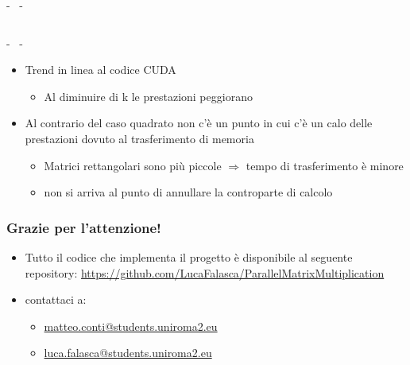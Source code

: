 \documentclass[compress]{beamer}
\begin{document}
\begin{frame}{\secname \text{ }- \subsecname\ \text{ }- \subsubsecname}
\begin{columns}
\begin{minipage}{0.75\textwidth}
\begin{adjustbox}{margin=1cm 0cm 0cm 0cm, center}
                \end{adjustbox}
            \end{minipage}
    \end{columns}
\end{frame}

\begin{frame}{\secname \text{ }- \subsecname\ \text{ }- \subsubsecname}
    \begin{itemize}
        \item Trend in linea al codice CUDA
        \begin{itemize}
            \item Al diminuire di k le prestazioni peggiorano
        \end{itemize}
        \item Al contrario del caso quadrato non c'è un punto in cui c'è un calo delle prestazioni dovuto al trasferimento di memoria
        \begin{itemize}
            \item Matrici rettangolari sono più piccole $\Rightarrow$ tempo di trasferimento è minore 
            \item non si arriva al punto di annullare la controparte di calcolo
        \end{itemize}
    \end{itemize} 
\end{frame}




\begin{frame}
    \frametitle{Grazie per l'attenzione!}
    \begin{itemize}
        \item Tutto il codice che implementa il progetto è disponibile al
        seguente repository: \href{https://github.com/LucaFalasca/ParallelMatrixMultiplication}{https://github.com/LucaFalasca/ParallelMatrixMultiplication}
        \item contattaci a:
            \begin{itemize}
                \item \href{mailto:matteo.conti@students.uniroma2.eu}{matteo.conti@students.uniroma2.eu}
                \item \href{mailto:luca.falasca@students.uniroma2.eu}{luca.falasca@students.uniroma2.eu}
            \end{itemize}
       \end{itemize}
\end{frame}
\end{document}
